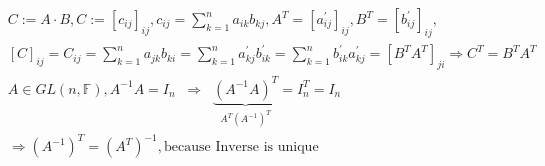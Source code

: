 \begin{align*}
&C := A \cdot B, C := [c_{ij}]_{ij}, c_{ij} = \sum\limits_{k=1}^n a_{ik}b_{kj}, A^T = [a^\prime_{ij}]_{ij}, B^T = [b^\prime_{ij}]_{ij},\\
&[C]_{ij} = C_{ij} = \sum\limits_{k=1}^n a_{jk}b_{ki} = \sum\limits_{k=1}^n a^\prime_{kj}b^\prime_{ik} = \sum\limits_{k=1}^n b^\prime_{ik}a^\prime_{kj} = [B^T A^T]_{ji} \Rightarrow C^T = B^T A^T\\
&A \in GL(n, \mathbb{F}), A^{-1}A = I_n \;\; \Rightarrow \;\; \underbrace{(A^{-1}A)^T}_{A^T (A^{-1})^T} = I_n^T = I_n\\
&\Rightarrow (A^{-1})^T = (A^T)^{-1}, \text{because Inverse is unique}
\end{align*}
